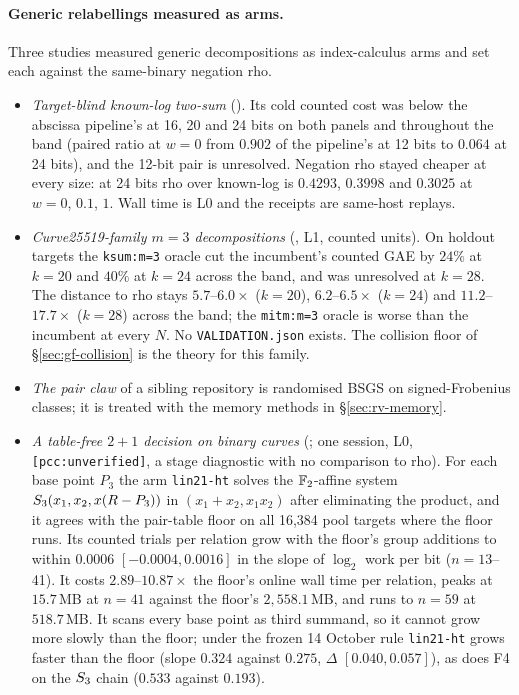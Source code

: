 \paragraph{Generic relabellings measured as arms.} Three studies measured
generic decompositions as index-calculus arms and set each against the
same-binary negation rho.
\begin{itemize}
\item \emph{Target-blind known-log two-sum}
  (). Its cold counted
  cost was below the abscissa pipeline's at 16, 20 and 24 bits on both
  panels and throughout the band (paired ratio at $w=0$ from $0.902$
  of the pipeline's at 12 bits to $0.064$ at 24 bits), and the 12-bit pair
  is unresolved.
  Negation rho stayed cheaper at every size: at 24 bits rho over known-log is
  $0.4293$, $0.3998$ and $0.3025$ at $w=0$, $0.1$, $1$. Wall time is L0 and
  the receipts are same-host replays.
\item \emph{Curve25519-family $m=3$ decompositions}
  (, L1, counted units). On
  holdout targets the \texttt{ksum:m=3} oracle cut the incumbent's counted
  GAE by $24\%$ at $k=20$ and $40\%$ at $k=24$ across the band, and was
  unresolved at $k=28$. The distance to rho stays $5.7$--$6.0\times$
  ($k=20$), $6.2$--$6.5\times$ ($k=24$) and $11.2$--$17.7\times$ ($k=28$)
  across the band; the \texttt{mitm:m=3} oracle is worse than the incumbent
  at every $N$. No \texttt{VALIDATION.json} exists. The collision floor of
  \S\ref{sec:gf-collision} is the theory for this family.
\item \emph{The pair claw} of a sibling repository is randomised BSGS on
  signed-Frobenius classes; it is treated with the memory methods in
  \S\ref{sec:rv-memory}.
\item \emph{A table-free $2+1$ decision on binary curves}
  (; one session, L0,
  \texttt{[pcc:unverified]}, a stage diagnostic with no comparison to rho).
  For each base point $P_3$ the arm \texttt{lin21-ht} solves the
  $\mathbb{F}_2$-affine system $S_{3}(x_1,x_2,x(R-P_3))$ in $(x_1+x_2,x_1x_2)$ after
  eliminating the product, and it agrees with the pair-table floor on all
  16{,}384 pool targets where the floor runs. Its counted trials per relation
  grow with the floor's group additions to within $0.0006$ $[-0.0004,0.0016]$
  in the slope of $\log_2$ work per bit ($n=13$--41). It costs
  $2.89$--$10.87\times$ the floor's online wall time per relation, peaks at
  $15.7$\,MB at $n=41$ against the floor's $2{,}558.1$\,MB, and runs to $n=59$
  at $518.7$\,MB. It scans every base point as third summand, so it cannot
  grow more slowly than the floor; under the frozen 14 October rule
  \texttt{lin21-ht} grows faster than the floor (slope $0.324$ against
  $0.275$, $\Delta$ $[0.040,0.057]$), as does F4 on the $S_{3}$ chain
  ($0.533$ against $0.193$).
\end{itemize}

